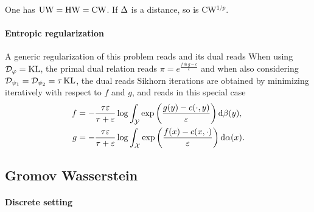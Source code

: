 \begin{thm}
	One has $\text{\upshape UW}=\text{\upshape HW}=\text{\upshape CW}$. If $\Delta$ is a distance, so is {\upshape CW}$^{1/p}$. 
\end{thm}


\paragraph{Entropic regularization}


A generic regularization of this problem reads
and its dual reads 
When using $\mathcal{D}_\varphi=\operatorname{KL}$, the primal dual relation reads $\pi=e^{\frac{f\oplus g - c}{\epsilon}}$ and when also considering $\mathcal{D}_{\psi_1}=\mathcal{D}_{\psi_2} = \tau \operatorname{KL}$, the dual reads
Sikhorn iterations are obtained by minimizing iteratively with respect to $f$ and $g$, and reads in this special case
\begin{align*}
	f &= -\frac{\tau\varepsilon}{\tau+\varepsilon} \log\int_{\mathcal{Y}} \exp\left(  \frac{g(y) - c(\cdot,y)}{\varepsilon}  \right)  \mathrm{d}\beta(y),  \\
	g &= -\frac{\tau\varepsilon}{\tau+\varepsilon} \log\int_{\mathcal{X}} \exp\left(  \frac{f(x) - c(x,\cdot)}{\varepsilon}  \right)  \mathrm{d}\alpha(x). \\
\end{align*}


\subsection{Gromov Wasserstein}


\paragraph{Discrete setting} 


